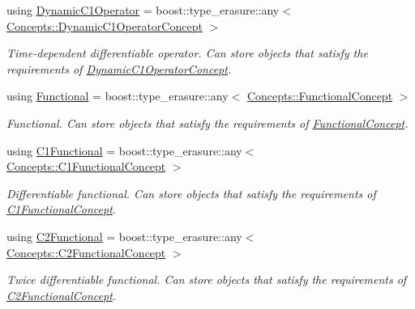 \begin{DoxyCompactItemize}
using \hyperlink{group__SpacyGroup_gabc9c830d2a7e020bcab097b10ee6f642_gabc9c830d2a7e020bcab097b10ee6f642}{Dynamic\+C1\+Operator} = boost\+::type\+\_\+erasure\+::any$<$ \hyperlink{group__ConceptGroup_gaa7ef0ce2d66b0610035541b580564b11_gaa7ef0ce2d66b0610035541b580564b11}{Concepts\+::\+Dynamic\+C1\+Operator\+Concept} $>$
\begin{DoxyCompactList}\small\item\em Time-\/dependent differentiable operator. Can store objects that satisfy the requirements of \hyperlink{group__ConceptGroup_gaa7ef0ce2d66b0610035541b580564b11_DynamicC1OperatorConceptAnchor}{Dynamic\+C1\+Operator\+Concept}. \end{DoxyCompactList}\item 
using \hyperlink{group__SpacyGroup_ga673218f603c93790864aef12c89d3a35_ga673218f603c93790864aef12c89d3a35}{Functional} = boost\+::type\+\_\+erasure\+::any$<$ \hyperlink{group__ConceptGroup_ga5273b50bd3e8c9a3f5a1e6b5f170836d_ga5273b50bd3e8c9a3f5a1e6b5f170836d}{Concepts\+::\+Functional\+Concept} $>$
\begin{DoxyCompactList}\small\item\em Functional. Can store objects that satisfy the requirements of \hyperlink{group__ConceptGroup_ga5273b50bd3e8c9a3f5a1e6b5f170836d_FunctionalConceptAnchor}{Functional\+Concept}. \end{DoxyCompactList}\item 
using \hyperlink{group__SpacyGroup_gaa7cb8ef6c287b0af0352d3dd0eb9f200_gaa7cb8ef6c287b0af0352d3dd0eb9f200}{C1\+Functional} = boost\+::type\+\_\+erasure\+::any$<$ \hyperlink{group__ConceptGroup_ga205b55d8291e0f2e143f116cf78bc54f_ga205b55d8291e0f2e143f116cf78bc54f}{Concepts\+::\+C1\+Functional\+Concept} $>$
\begin{DoxyCompactList}\small\item\em Differentiable functional. Can store objects that satisfy the requirements of \hyperlink{group__ConceptGroup_ga205b55d8291e0f2e143f116cf78bc54f_C1FunctionalConceptAnchor}{C1\+Functional\+Concept}. \end{DoxyCompactList}\item 
using \hyperlink{group__SpacyGroup_gaf5b89e117806134b06a1ce4629fb2b65_gaf5b89e117806134b06a1ce4629fb2b65}{C2\+Functional} = boost\+::type\+\_\+erasure\+::any$<$ \hyperlink{group__ConceptGroup_gafb4414561b07b27100cad81ecf152e47_gafb4414561b07b27100cad81ecf152e47}{Concepts\+::\+C2\+Functional\+Concept} $>$
\begin{DoxyCompactList}\small\item\em Twice differentiable functional. Can store objects that satisfy the requirements of \hyperlink{group__ConceptGroup_gafb4414561b07b27100cad81ecf152e47_C2FunctionalConceptAnchor}{C2\+Functional\+Concept}. \end{DoxyCompactList}\item 

\end{DoxyCompactItemize}
